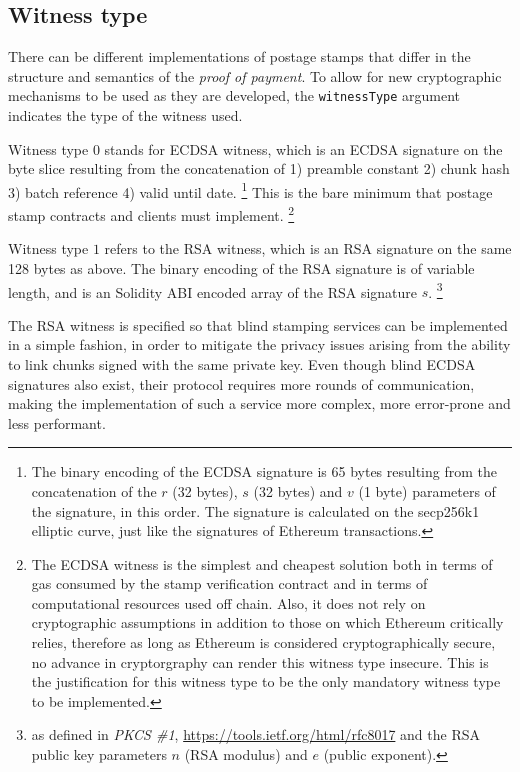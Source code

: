 
\subsection{Witness type}

There can be different implementations of postage stamps that differ in the structure and semantics of the \emph{proof of payment}. To allow for new cryptographic mechanisms to be used as they are developed, the \lstinline{witnessType} argument indicates the type of the witness used. 

Witness type $0$ stands for ECDSA witness, which is an ECDSA signature on the byte slice resulting from the concatenation of   1) preamble constant 2) chunk hash 3) batch reference 4) valid until date.%
%
\footnote{The binary encoding of the ECDSA signature is 65 bytes resulting from the concatenation of the $r$ (32 bytes), $s$ (32 bytes) and $v$ (1 byte) parameters of the signature, in this order. The signature is calculated on the secp256k1 elliptic curve, just like the signatures of Ethereum transactions.}
%
This is the bare minimum that postage stamp contracts and clients must implement.%
%
\footnote{The ECDSA witness is the simplest and cheapest solution both in terms of gas consumed by the stamp verification contract and in terms of computational resources used off chain. Also, it does not rely on cryptographic assumptions in addition to those on which Ethereum critically relies, therefore as long as Ethereum is considered cryptographically secure, no advance in cryptorgraphy can render this witness type insecure. This is the justification for this witness type to be the only mandatory witness type to be implemented.}

Witness type $1$ refers to the RSA witness, which is an RSA signature on the same 128 bytes as above. The binary encoding of the RSA signature is of variable length, and is an Solidity ABI encoded array of the RSA signature $s$.%
%
\footnote{as defined in \emph{PKCS \#1}, \url{https://tools.ietf.org/html/rfc8017} and the RSA public key parameters $n$ (RSA modulus) and $e$ (public exponent).}

The RSA witness is specified so that blind stamping services can be implemented in a simple fashion, in order to mitigate the privacy issues arising from the ability to link chunks signed with the same private key. Even though blind ECDSA signatures also exist, their protocol requires more rounds of communication, making the implementation of such a service more complex, more error-prone and less performant. 

